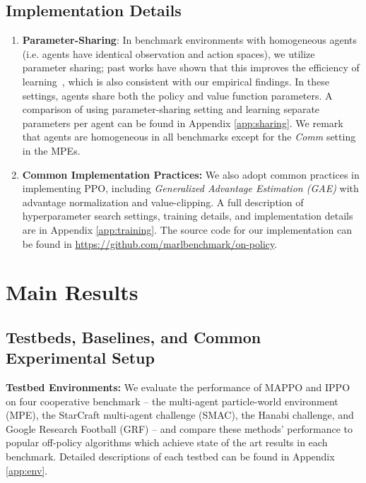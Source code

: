 \documentclass{article}
\theoremstyle{plain}
\theoremstyle{definition}
\theoremstyle{remark}
\begin{document}
\subsection{Implementation Details}
\begin{enumerate}[nolistsep,leftmargin=*]
    \item[$\bullet$] \textbf{Parameter-Sharing}: In benchmark environments with homogeneous agents (i.e. agents have identical observation and action spaces), we utilize parameter sharing; past works have shown that this improves the efficiency of learning~\citep{christianos2021scaling,terry2021revisiting}, which is also consistent with our empirical findings. In these settings, agents share both the policy and value function parameters. A comparison of using parameter-sharing setting and learning separate parameters per agent can be found in Appendix \ref{app:sharing}. We remark that agents are homogeneous in all benchmarks except for the \emph{Comm} setting in the MPEs.
    \item[$\bullet$] \textbf{Common Implementation Practices:} We also adopt common practices in implementing PPO, including \emph{Generalized Advantage Estimation (GAE)} \cite{Schulmanetal_ICLR2016} with advantage normalization and value-clipping. A full description of hyperparameter search settings, training details, and implementation details are in Appendix \ref{app:training}. The source code for our implementation can be found in \url{https://github.com/marlbenchmark/on-policy}.

\end{enumerate}


\section{Main Results} \label{sec:results} 

\vspace{-1mm}
\subsection{Testbeds, Baselines, and Common Experimental Setup} \vspace{-1mm}
\textbf{Testbed Environments:} We evaluate the performance of MAPPO and IPPO on four cooperative benchmark -- the multi-agent particle-world environment (MPE), the StarCraft  multi-agent challenge (SMAC), the Hanabi challenge, and Google Research Football (GRF) -- and compare these methods' performance to popular off-policy algorithms which achieve state of the art results in each benchmark. Detailed descriptions of each testbed can be found in Appendix \ref{app:env}.
\end{document}
